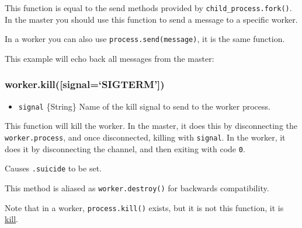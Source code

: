 This function is equal to the send methods provided by
\texttt{child\_process.fork()}. In the master you should use this
function to send a message to a specific worker.

In a worker you can also use \texttt{process.send(message)}, it is the
same function.

This example will echo back all messages from the master:

\begin{Shaded}
\begin{Highlighting}[]
 \NormalTok{(}\NormalTok{) \{}
   \NormalTok{();}
  \NormalTok{(}\NormalTok{);}

\NormalTok{\} }  \NormalTok{(}\NormalTok{) \{}
  \NormalTok{(}\NormalTok{, }
  \NormalTok{\});}
\NormalTok{\}}
\end{Highlighting}
\end{Shaded}

\subsubsection{\texorpdfstring{worker.kill({[}signal=`SIGTERM'{]})}{worker.kill({[}signal=SIGTERM{]})}}\label{worker.killsignalsigterm}

\begin{itemize}
\itemsep1pt\parskip0pt
\item
  \texttt{signal} \{String\} Name of the kill signal to send to the
  worker process.
\end{itemize}

This function will kill the worker. In the master, it does this by
disconnecting the \texttt{worker.process}, and once disconnected,
killing with \texttt{signal}. In the worker, it does it by disconnecting
the channel, and then exiting with code \texttt{0}.

Causes \texttt{.suicide} to be set.

This method is aliased as \texttt{worker.destroy()} for backwards
compatibility.

Note that in a worker, \texttt{process.kill()} exists, but it is not
this function, it is
\href{process.html\#process_process_kill_pid_signal}{kill}.

